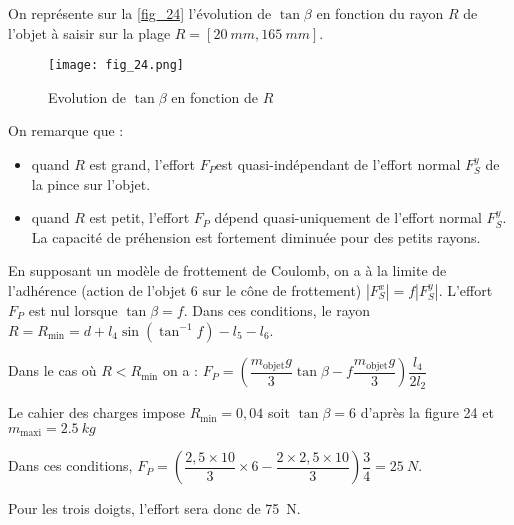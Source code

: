 \ifprof
\else
On représente sur la \autoref{fig_24}  l'évolution de $\tan \beta$ en fonction du rayon $R$ de l'objet à saisir sur la plage $R =[\SI{20}{mm}, \SI{165}{mm}]$.

\begin{figure}[H]
\centering
\texttt{[image: fig\_24.png]}
\caption{Evolution de $\tan \beta$ en fonction de $R$ \label{fig_24}}
\end{figure}
\fi


\ifprof
\begin{corrige}
On remarque que :
\begin{itemize}
\item quand $R$ est grand, l’effort $F_P$est quasi-indépendant de l’effort normal $F_S^y$ de la pince sur l’objet. 
\item quand $R$ est petit, l’effort $F_P$ dépend quasi-uniquement de l’effort normal $F_S^y$. La capacité de préhension est fortement diminuée pour des petits rayons.
\end{itemize}
\end{corrige}
\else
\fi

\ifprof
\begin{corrige}
En supposant un modèle de frottement de Coulomb, on a à la limite de l'adhérence (action de l’objet 6 sur le cône de frottement)
$|F_S^x |=f |F_S^y |$. L’effort $F_P$ est nul lorsque $\tan\beta =f$.
Dans ces conditions, le rayon 
$
R=R_{\text{min}} = d+l_4 \sin \left (\tan^{-1} f \right) -l_5 -l_6$.

\end{corrige}
\else
\fi

\ifprof
\begin{corrige}
Dans le cas où $R<R_{\text{min}}$ on a :
$F_P=\left(\dfrac{m_{\text{objet}}g}{3} \tan \beta -f \dfrac{m_{\text{objet}} g}{3}\right) \dfrac{l_4}{2l_2}$ 

Le cahier des charges impose  $R_{\text{min}}=0,04$ soit  $\tan\beta =6$ d’après la figure 24 et  $m_{\text{maxi}}=\SI{2,5}{kg}$

Dans ces conditions,
$F_P=\left(\dfrac{2,5\times 10}{3} \times 6- \dfrac{2 \times 2,5\times 10}{3}\right)  \dfrac{3}{4}=\SI{25}{N}$.

Pour les trois doigts, l’effort sera donc de \SI{75}{N}.

\end{corrige}
\else
\fi

